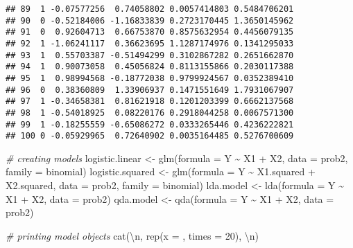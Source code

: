 \documentclass[
]{article}
\newenvironment{Shaded}{\begin{snugshade}}{\end{snugshade}}
\newcommand{\AttributeTok}[1]{\textcolor[rgb]{0.77,0.63,0.00}{#1}}
\newcommand{\CommentTok}[1]{\textcolor[rgb]{0.56,0.35,0.01}{\textit{#1}}}
\newcommand{\DecValTok}[1]{\textcolor[rgb]{0.00,0.00,0.81}{#1}}
\newcommand{\FunctionTok}[1]{\textcolor[rgb]{0.00,0.00,0.00}{#1}}
\newcommand{\NormalTok}[1]{#1}
\newcommand{\OtherTok}[1]{\textcolor[rgb]{0.56,0.35,0.01}{#1}}
\newcommand{\SpecialCharTok}[1]{\textcolor[rgb]{0.00,0.00,0.00}{#1}}
\newcommand{\StringTok}[1]{\textcolor[rgb]{0.31,0.60,0.02}{#1}}
\begin{document}
\begin{verbatim}
## 89  1 -0.07577256  0.74058802 0.0057414803 0.5484706201
## 90  0 -0.52184006 -1.16833839 0.2723170445 1.3650145962
## 91  0  0.92604713  0.66753870 0.8575632954 0.4456079135
## 92  1 -1.06241117  0.36623695 1.1287174976 0.1341295033
## 93  1  0.55703387 -0.51494299 0.3102867282 0.2651662870
## 94  1  0.90073058  0.45056824 0.8113155866 0.2030117388
## 95  1  0.98994568 -0.18772038 0.9799924567 0.0352389410
## 96  0  0.38360809  1.33906937 0.1471551649 1.7931067907
## 97  1 -0.34658381  0.81621918 0.1201203399 0.6662137568
## 98  1 -0.54018925  0.08220176 0.2918044258 0.0067571300
## 99  1 -0.18255559 -0.65086272 0.0333265446 0.4236222821
## 100 0 -0.05929965  0.72640902 0.0035164485 0.5276700609
\end{verbatim}

\begin{Shaded}
\begin{Highlighting}[]
\CommentTok{\# creating models}
\NormalTok{logistic.linear }\OtherTok{\textless{}{-}} \FunctionTok{glm}\NormalTok{(}\AttributeTok{formula =}\NormalTok{ Y }\SpecialCharTok{\textasciitilde{}}\NormalTok{ X1 }\SpecialCharTok{+}\NormalTok{ X2, }\AttributeTok{data =}\NormalTok{ prob2, }\AttributeTok{family =}\NormalTok{ binomial)}
\NormalTok{logistic.squared }\OtherTok{\textless{}{-}} \FunctionTok{glm}\NormalTok{(}\AttributeTok{formula =}\NormalTok{ Y }\SpecialCharTok{\textasciitilde{}}\NormalTok{ X1.squared }\SpecialCharTok{+}\NormalTok{ X2.squared, }\AttributeTok{data =}\NormalTok{ prob2, }\AttributeTok{family =}\NormalTok{ binomial)}
\NormalTok{lda.model }\OtherTok{\textless{}{-}} \FunctionTok{lda}\NormalTok{(}\AttributeTok{formula =}\NormalTok{ Y }\SpecialCharTok{\textasciitilde{}}\NormalTok{ X1 }\SpecialCharTok{+}\NormalTok{ X2, }\AttributeTok{data =}\NormalTok{ prob2)}
\NormalTok{qda.model }\OtherTok{\textless{}{-}} \FunctionTok{qda}\NormalTok{(}\AttributeTok{formula =}\NormalTok{ Y }\SpecialCharTok{\textasciitilde{}}\NormalTok{ X1 }\SpecialCharTok{+}\NormalTok{ X2, }\AttributeTok{data =}\NormalTok{ prob2)}

\CommentTok{\# printing model objects}
\FunctionTok{cat}\NormalTok{(}\StringTok{\textquotesingle{}}\SpecialCharTok{\textbackslash{}n}\StringTok{\textquotesingle{}}\NormalTok{, }\FunctionTok{rep}\NormalTok{(}\AttributeTok{x =} \StringTok{\textquotesingle{}{-}\textquotesingle{}}\NormalTok{, }\AttributeTok{times =} \DecValTok{20}\NormalTok{), }\StringTok{\textquotesingle{}}\SpecialCharTok{\textbackslash{}n}\StringTok{\textquotesingle{}}\NormalTok{)}
\end{Highlighting}
\end{Shaded}
\end{document}
